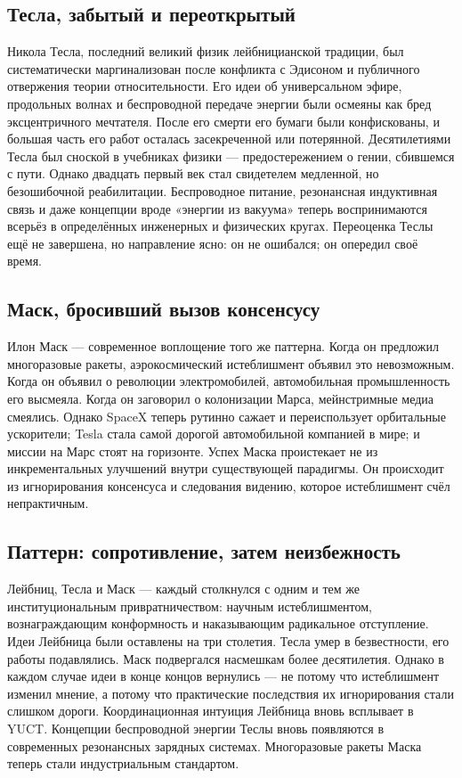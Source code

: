 \documentclass[12pt,a4paper]{article}
\begin{document}
	\subsection{Тесла, забытый и переоткрытый}
	
	Никола Тесла, последний великий физик лейбницианской традиции, был систематически маргинализован после конфликта с Эдисоном и публичного отвержения теории относительности. Его идеи об универсальном эфире, продольных волнах и беспроводной передаче энергии были осмеяны как бред эксцентричного мечтателя. После его смерти его бумаги были конфискованы, и большая часть его работ осталась засекреченной или потерянной. Десятилетиями Тесла был сноской в учебниках физики — предостережением о гении, сбившемся с пути. Однако двадцать первый век стал свидетелем медленной, но безошибочной реабилитации. Беспроводное питание, резонансная индуктивная связь и даже концепции вроде «энергии из вакуума» теперь воспринимаются всерьёз в определённых инженерных и физических кругах. Переоценка Теслы ещё не завершена, но направление ясно: он не ошибался; он опередил своё время.
	
	\subsection{Маск, бросивший вызов консенсусу}
	
	Илон Маск — современное воплощение того же паттерна. Когда он предложил многоразовые ракеты, аэрокосмический истеблишмент объявил это невозможным. Когда он объявил о революции электромобилей, автомобильная промышленность его высмеяла. Когда он заговорил о колонизации Марса, мейнстримные медиа смеялись. Однако SpaceX теперь рутинно сажает и переиспользует орбитальные ускорители; Tesla стала самой дорогой автомобильной компанией в мире; и миссии на Марс стоят на горизонте. Успех Маска проистекает не из инкрементальных улучшений внутри существующей парадигмы. Он происходит из игнорирования консенсуса и следования видению, которое истеблишмент счёл непрактичным.
	
	\subsection{Паттерн: сопротивление, затем неизбежность}
	
	Лейбниц, Тесла и Маск — каждый столкнулся с одним и тем же институциональным привратничеством: научным истеблишментом, вознаграждающим конформность и наказывающим радикальное отступление. Идеи Лейбница были оставлены на три столетия. Тесла умер в безвестности, его работы подавлялись. Маск подвергался насмешкам более десятилетия. Однако в каждом случае идеи в конце концов вернулись — не потому что истеблишмент изменил мнение, а потому что практические последствия их игнорирования стали слишком дороги. Координационная интуиция Лейбница вновь всплывает в YUCT. Концепции беспроводной энергии Теслы вновь появляются в современных резонансных зарядных системах. Многоразовые ракеты Маска теперь стали индустриальным стандартом.
	
\end{document}
